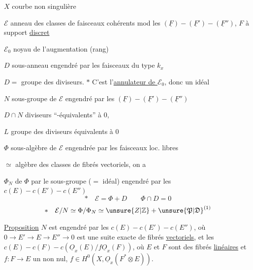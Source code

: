 

$X$ courbe non singulière

$\mathcal E$ anneau des classes de faisceaux cohérents mod les
$(\underline F)-(\underline F')-(\underline F'')$, 
 $F$ à support \uline{discret}

$\mathcal E_0$ noyau de l'augmentation (rang)

$D$ sous-anneau engendré par les faisceaux  du type $k_x$

$D=$ groupe des diviseurs. $*$ C'est l'\uline{annulateur de $\mathcal E_0$}, donc un idéal

$N$ sous-groupe de $\mathcal E$ engendré par les
$(\underline F)-(\underline F')-(\underline F'')$

$D\cap N$  diviseurs ``-équivalents'' à $0$,

$L$ groupe des diviseurs équivalents à $0$

$\Phi$ sous-algèbre de $\mathcal E$ engendrée par les  faisceaux loc. libres

$\simeq$ algèbre des classes de fibrés vectoriels, on a

$\Phi_N$  de $\Phi$ par le sous-groupe ($=$ idéal) engendré par les
$c(E)-c(E')-c(E'')$
\[
*\quad \mathcal E=\Phi+D\qquad \Phi\cap D=0
\]
\[
*\quad \mathcal E/N\simeq\Phi/\Phi_N\simeq \unsure{Z|\mathbb Z}+\unsure{\mathfrak P|\mathfrak D}^{(1)}
\]

\uline{Proposition} $N$ est engendré par les $c(E)-c(E')-c(E'')$, où
$0\to E'\to E\to E''\to0$ est une suite exacte de fibrés \uline{vectoriels}, et
les $c(E)-c(F)-c(\underline O_x(E)/f\underline O_x(F))$, où $E$ et $F$ sont des fibrés
\uline{linéaires} et $f:F\to E$ un  non nul,
 $f\in H^0(X,\underline O_x(F^*\otimes E))$.

